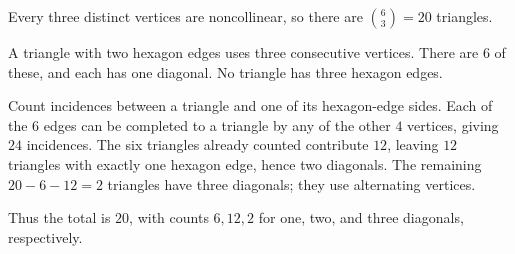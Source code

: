 Every three distinct vertices are noncollinear, so there are $\binom63=20$ triangles.

A triangle with two hexagon edges uses three consecutive vertices. There are $6$ of these, and each has one diagonal. No triangle has three hexagon edges.

Count incidences between a triangle and one of its hexagon-edge sides. Each of the $6$ edges can be completed to a triangle by any of the other $4$ vertices, giving $24$ incidences. The six triangles already counted contribute $12$, leaving $12$ triangles with exactly one hexagon edge, hence two diagonals. The remaining $20-6-12=2$ triangles have three diagonals; they use alternating vertices.

Thus the total is $\boxed{20}$, with counts $\boxed{6,12,2}$ for one, two, and three diagonals, respectively.
